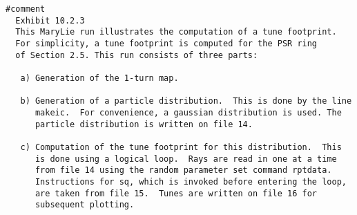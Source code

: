 \begin{footnotesize}
\begin{verbatim}
#comment
  Exhibit 10.2.3
  This MaryLie run illustrates the computation of a tune footprint.
  For simplicity, a tune footprint is computed for the PSR ring
  of Section 2.5. This run consists of three parts:

   a) Generation of the 1-turn map.

   b) Generation of a particle distribution.  This is done by the line
      makeic.  For convenience, a gaussian distribution is used. The
      particle distribution is written on file 14.

   c) Computation of the tune footprint for this distribution.  This
      is done using a logical loop.  Rays are read in one at a time
      from file 14 using the random parameter set command rptdata.
      Instructions for sq, which is invoked before entering the loop,
      are taken from file 15.  Tunes are written on file 16 for
      subsequent plotting.


\end{verbatim}
\end{footnotesize}

